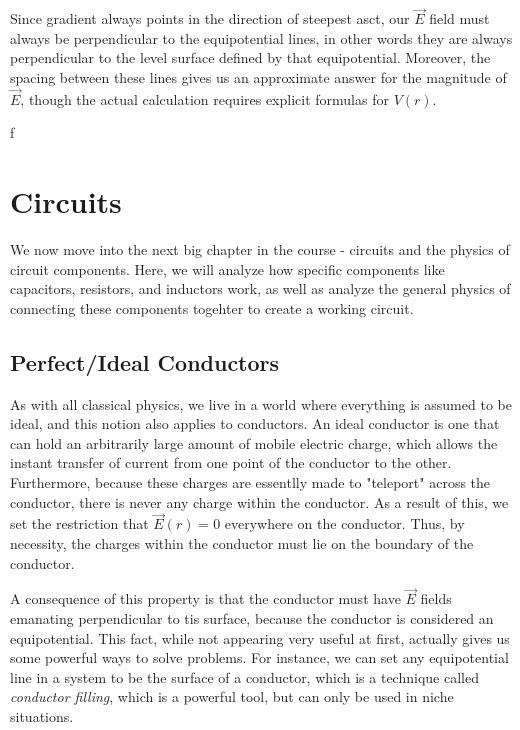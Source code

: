 \documentclass{report}
\theoremstyle{definition}
\numberwithin{equation}{section}
\numberwithin{definition}{section}
\begin{document}
    Since gradient always points in the direction of steepest asct, our $\vec{E}$ field must always be perpendicular to the equipotential lines, in other words they are always perpendicular to the level surface defined by that equipotential. Moreover, the spacing between these lines gives us an approximate answer for the magnitude of $\vec{E}$, though the actual calculation requires explicit formulas for $V(r)$.

ƒ    %


    \chapter{Circuits}

    We now move into the next big chapter in the course - circuits and the physics of circuit components. Here, we will analyze how specific components like capacitors, resistors, and inductors work, as well as analyze the general physics of connecting these components togehter to create a working circuit.

    \section{Perfect/Ideal Conductors}

    As with all classical physics, we live in a world where everything is assumed to be ideal, and this notion also applies to conductors. An ideal conductor is one that can hold an arbitrarily large amount of mobile electric charge, which allows the instant transfer of current from one point of the conductor to the other. Furthermore, because these charges are essentlly made to "teleport" across the conductor, there is never any charge within the conductor. As a result of this, we set the restriction that $\vec{E}(r) = 0$ everywhere on the conductor. Thus, by necessity, the charges within the conductor must lie on the boundary of the conductor. 

    A consequence of this property is that the conductor must have $\vec{E}$ fields emanating perpendicular to tis surface, because the conductor is considered an equipotential. This fact, while not appearing very useful at first, actually gives us some powerful ways to solve problems. For instance, we can set any equipotential line in a system to be the surface of a conductor, which is a technique called \textit{conductor filling}, which is a powerful tool, but can only be used in niche situations. 

    
\end{document}
